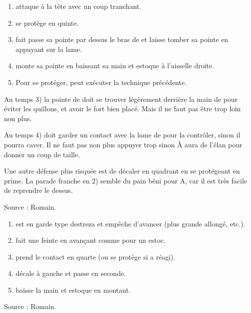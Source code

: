 \begin{technique}

\begin{enumerate}
	\item \A attaque \D à la tête avec un coup tranchant.
	\item \D se protège en quinte.
	\item \D fait passe sa pointe par dessus le bras de \A et laisse tomber sa pointe en appuyant sur la lame.
	\item \D monte sa pointe en baissant sa main et estoque \A à l'aisselle droite.
	\item Pour se protéger, \A peut exécuter la technique précédente.
\end{enumerate}

Au temps 3) la pointe de \D doit se trouver légèrement derrière la main de \A pour éviter les quillons, et avoir le fort bien placé. Mais il ne faut pas être trop loin non plus.

Au temps 4) \D doit garder un contact avec la lame de \A pour la contrôler, sinon il pourra caver. Il ne faut pas non plus appuyer trop sinon À aura de l'élan pour donner un coup de taille.

Une autre défense plus risquée est de décaler en quadrant en se protégeant en prime.
La parade franche en 2) semble du pain béni pour A, car il est très facile de reprendre le dessus.

Source : Romain.

\end{technique}


\begin{technique}

\begin{enumerate}
	\item \A est en garde type destreza et empêche \D d'avancer (plus grande allongé, etc.).
	\item \D fait une feinte en avançant comme pour un estoc.
	\item \D prend le contact en quarte (ou se protège si \A a réagi).
	\item \D décale à gauche et passe en seconde.
	\item \D baisse la main et estoque en montant.
\end{enumerate}

Source : Romain.

\end{technique}
